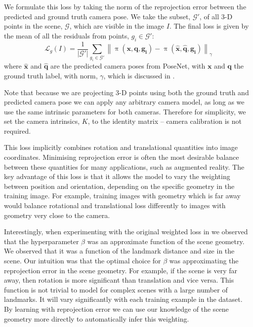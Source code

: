 We formulate this loss by taking the norm of the reprojection error between the predicted and ground truth camera pose. We take the subset, $\mathcal{G'}$, of all 3-D points in the scene, $\mathcal{G}$, which are visible in the image $I$. The final loss  is given by the mean of all the residuals from points, $g_i \in \mathcal{G'}$:
\begin{equation}
\mathcal{L}_g(I) = \dfrac{1}{|\mathcal{G}'|} \sum\limits_{g_i \in \mathcal{G}'} \left\lVert \uppi (\mathbf{x},\mathbf{q},\mathbf{g_i}) - \uppi (\mathbf{\hat{x}},\mathbf{\hat{q}},\mathbf{g_i}) \right\rVert_\gamma
\label{eqn:loss_reproject}
\end{equation}
where $\mathbf{\hat{x}}$ and $\mathbf{\hat{q}}$ are the predicted camera poses from PoseNet, with $\mathbf{x}$ and $\mathbf{q}$ the ground truth label, with norm, $\gamma$, which is discussed in .

Note that because we are projecting 3-D points using both the ground truth and predicted camera pose we can apply any arbitrary camera model, as long as we use the same intrinsic parameters for both cameras. Therefore for simplicity, we set the camera intrinsics, $K$, to the identity matrix -- camera calibration is not required.

This loss implicitly combines rotation and translational quantities into image coordinates. Minimising reprojection error is often the most desirable balance between these quantities for many applications, such as augmented reality. The key advantage of this loss is that it allows the model to vary the weighting between position and orientation, depending on the specific geometry in the training image. For example, training images with geometry which is far away would balance rotational and translational loss differently to images with geometry very close to the camera.

Interestingly, when experimenting with the original weighted loss in  we observed that the hyperparameter $\beta$ was an approximate function of the scene geometry. We observed that it was a function of the landmark distance and size in the scene. Our intuition was that the optimal choice for $\beta$ was approximating the reprojection error in the scene geometry. For example, if the scene is very far away, then rotation is more significant than translation and vice versa. This function is not trivial to model for complex scenes with a large number of landmarks. It will vary significantly with each training example in the dataset. By learning with reprojection error we can use our knowledge of the scene geometry more directly to automatically infer this weighting.

